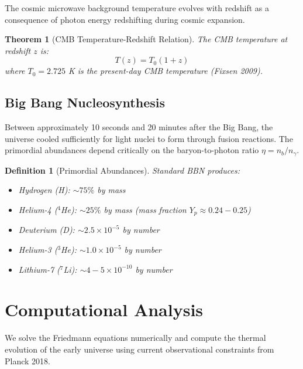 \documentclass[a4paper, 11pt]{article}
\newtheorem{definition}{Definition}[section]
\newtheorem{theorem}{Theorem}[section]
\begin{document}
The cosmic microwave background temperature evolves with redshift as a consequence of photon
energy redshifting during cosmic expansion.

\begin{theorem}[CMB Temperature-Redshift Relation]
The CMB temperature at redshift $z$ is:
\begin{equation}
T(z) = T_0(1+z)
\end{equation}
where $T_0 = 2.725$ K is the present-day CMB temperature (Fixsen 2009).
\end{theorem}

\subsection{Big Bang Nucleosynthesis}

Between approximately 10 seconds and 20 minutes after the Big Bang, the universe cooled
sufficiently for light nuclei to form through fusion reactions. The primordial abundances
depend critically on the baryon-to-photon ratio $\eta = n_b/n_\gamma$.

\begin{definition}[Primordial Abundances]
Standard BBN produces:
\begin{itemize}
\item Hydrogen (H): $\sim 75\%$ by mass
\item Helium-4 ($^4$He): $\sim 25\%$ by mass (mass fraction $Y_p \approx 0.24-0.25$)
\item Deuterium (D): $\sim 2.5 \times 10^{-5}$ by number
\item Helium-3 ($^3$He): $\sim 1.0 \times 10^{-5}$ by number
\item Lithium-7 ($^7$Li): $\sim 4-5 \times 10^{-10}$ by number
\end{itemize}
\end{definition}

\section{Computational Analysis}

We solve the Friedmann equations numerically and compute the thermal evolution of the
early universe using current observational constraints from Planck 2018.
\end{document}
